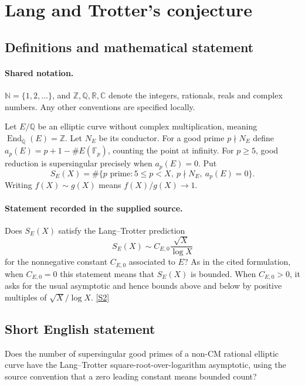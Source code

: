 \documentclass[11pt]{article}
\newcommand{\sref}[2]{\hyperlink{source:#1:#2}{[S#2]}}
\begin{document}
\section{Lang and Trotter's conjecture}\label{statement}

\subsection{Definitions and mathematical statement}

\paragraph{Shared notation.}$\mathbb N=\{1,2,\ldots\}$, and $\mathbb Z,\mathbb Q,\mathbb R,\mathbb C$ denote the integers, rationals, reals and complex numbers. Any other conventions are specified locally.


Let $E/\mathbb Q$ be an elliptic curve without complex multiplication, meaning $\operatorname{End}_{\overline{\mathbb Q}}(E)=\mathbb Z$. Let $N_E$ be its conductor. For a good prime $p\nmid N_E$ define $a_p(E)=p+1-\#E(\mathbb F_p)$, counting the point at infinity. For $p\ge5$, good reduction is supersingular precisely when $a_p(E)=0$. Put
\[
S_E(X)=\#\{p\text{ prime}:5\le p<X,\ p\nmid N_E,\ a_p(E)=0\}.
\]
Writing $f(X)\sim g(X)$ means $f(X)/g(X)\to1$.
\paragraph{Statement recorded in the supplied source.}
Does $S_E(X)$ satisfy the Lang--Trotter prediction
\[S_E(X)\sim C_{E,0}\frac{\sqrt X}{\log X}\]
for the nonnegative constant $C_{E,0}$ associated to $E$? As in the cited formulation, when $C_{E,0}=0$ this statement means that $S_E(X)$ is bounded. When $C_{E,0}>0$, it asks for the usual asymptotic and hence bounds above and below by positive multiples of $\sqrt X/\log X$. \sref{statement}{2}
\subsection{Short English statement}
Does the number of supersingular good primes of a non-CM rational elliptic curve have the Lang--Trotter square-root-over-logarithm asymptotic, using the source convention that a zero leading constant means bounded count?
\end{document}
